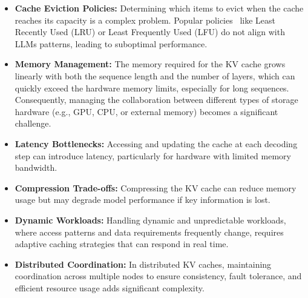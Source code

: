 \begin{itemize}[leftmargin=10pt]
    \item \textbf{Cache Eviction Policies:} 
    Determining which items to evict when the cache reaches its capacity is a complex problem. Popular policies~\cite{podlipnig2003survey} like Least Recently Used (LRU) or Least Frequently Used (LFU) do not align with LLMs  patterns, leading to suboptimal performance.

    \item \textbf{Memory Management:} 
    The memory required for the KV cache grows linearly with both the sequence length and the number of layers, which can quickly exceed the hardware memory limits, especially for long sequences. Consequently, managing the collaboration between different types of storage hardware (e.g., GPU, CPU, or external memory) becomes a significant challenge.




    
    \item \textbf{Latency Bottlenecks:} Accessing and updating the cache at each decoding step can introduce latency, particularly for hardware with limited memory bandwidth.

    \item \textbf{Compression Trade-offs:} Compressing the KV cache can reduce memory usage but may degrade model performance if key information is lost.

    \item \textbf{Dynamic Workloads:} Handling dynamic and unpredictable workloads, where access patterns and data requirements frequently change, requires adaptive caching strategies that can respond in real time.


    \item \textbf{Distributed Coordination:} In distributed KV caches, maintaining coordination across multiple nodes to ensure consistency, fault tolerance, and efficient resource usage adds significant complexity.

\end{itemize}